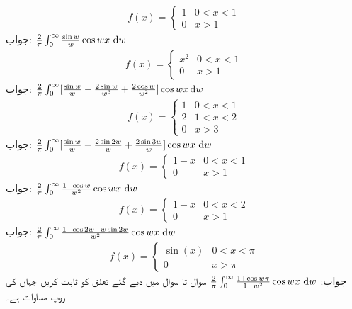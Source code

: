 \begin{align*}
f(x)=
\begin{cases}
1&0<x<1\\
0&x>1
\end{cases}
\end{align*}
جواب:\quad
$\tfrac{2}{\pi}\int_0^{\infty} \tfrac{\sin w}{w}\cos wx\,\dif w$
\begin{align*}
f(x)=
\begin{cases}
x^2&0<x<1\\
0&x>1
\end{cases}
\end{align*}
جواب:\quad
$\tfrac{2}{\pi}\int_0^{\infty} [\tfrac{\sin w}{w}-\tfrac{2\sin w}{w^3}+\tfrac{2\cos w}{w^2}]\cos wx\dif w$
\begin{align*}
f(x)=
\begin{cases}
1&0<x<1\\
2&1<x<2\\
0&x>3
\end{cases}
\end{align*}
جواب:\quad
$\tfrac{2}{\pi}\int_0^{\infty}[\tfrac{\sin w}{w}-\tfrac{2\sin 2w}{w}+\tfrac{2\sin 3w}{w}]\cos wx\,\dif w$
\begin{align*}
f(x)=
\begin{cases}
1-x&0<x<1\\
0&x>1
\end{cases}
\end{align*}
جواب:\quad
$\tfrac{2}{\pi}\int_0^{\infty}\tfrac{1-\cos w}{w^2}\cos wx\,\dif w$
\begin{align*}
f(x)=
\begin{cases}
1-x&0<x<2\\
0&x>1
\end{cases}
\end{align*}
جواب:\quad
$\tfrac{2}{\pi}\int_0^{\infty}\tfrac{1-\cos 2w-w\sin 2w}{w^2}\cos wx\,\dif w$
\begin{align*}
f(x)=
\begin{cases}
\sin(x)&0<x<\pi \\
0&x>\pi
\end{cases}
\end{align*}
جواب:\quad
$\tfrac{2}{\pi}\int_0^{\infty}\tfrac{1+\cos w\pi}{1-w^2}\cos wx\,\dif w$
سوال  تا سوال  میں دیے گئے تعلق کو ثابت کریں جہاں  کی روپ مساوات  ہے۔ 

